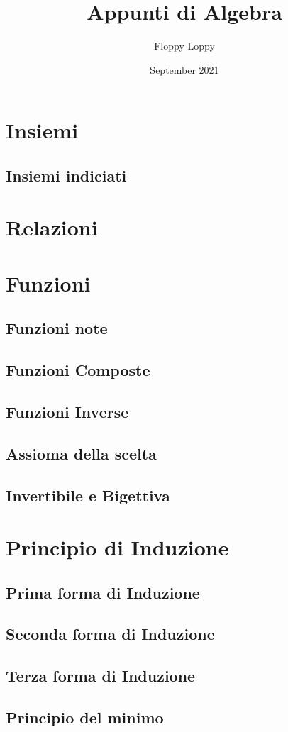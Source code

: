 \documentclass{article}
\title{Appunti di Algebra}
\author{Floppy Loppy}
\date{September 2021}
\begin{document}
\section{Insiemi}
\subsection{Insiemi indiciati}

\section{Relazioni}

\section{Funzioni}
\subsection{Funzioni note}
\subsection{Funzioni Composte}
\subsection{Funzioni Inverse}
\subsection{Assioma della scelta}
\subsection{Invertibile e Bigettiva}


\section{Principio di Induzione}
\subsection{Prima forma di Induzione}
\subsection{Seconda forma di Induzione}
\subsection{Terza forma di Induzione}
\subsection{Principio del minimo}
\end{document}
